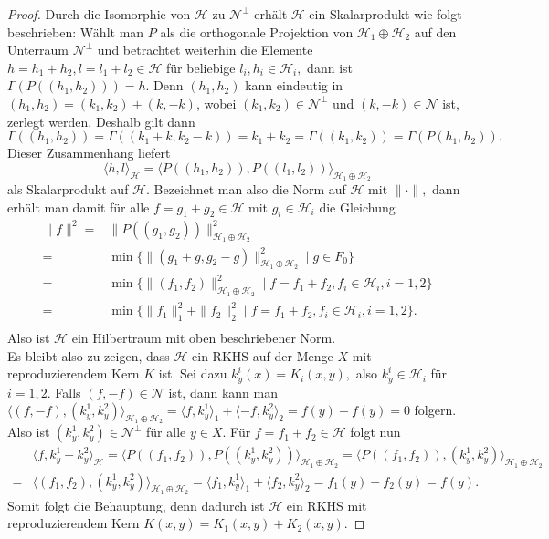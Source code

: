 \documentclass[12pt,titlepage,twoside,cleardoublepage]{article}
\theoremstyle{nummermitklammern}
\numberwithin{equation}{section}
\begin{document}
\begin{proof}
 Durch die Isomorphie von $\mathcal{H}$ zu $\mathcal{N}^{\bot}$ erhält $\mathcal{H}$ ein Skalarprodukt wie folgt beschrieben: Wählt man $P$ als die orthogonale Projektion von $\mathcal{H}_1\oplus \mathcal{H}_2$ auf den Unterraum $\mathcal{N}^{\bot}$ und betrachtet weiterhin die Elemente $h=h_1+h_2,l=l_1+l_2\in \mathcal{H}$ für beliebige $l_i,h_i\in \mathcal{H}_i,$ dann ist $\Gamma(P((h_1,h_2)))=h.$ Denn $(h_1,h_2)$ kann eindeutig in $(h_1,h_2)=(k_1,k_2)+(k,-k)$, wobei $(k_1,k_2)\in \mathcal{N}^{\bot}$ und $(k,-k)\in \mathcal{N}$ ist, zerlegt werden. Deshalb gilt dann $\Gamma((h_1,h_2))=\Gamma((k_1+k,k_2-k))=k_1+k_2=\Gamma((k_1,k_2))=\Gamma(P(h_1,h_2)).$ Dieser Zusammenhang liefert
\[
\langle h,l\rangle_{\mathcal{H}}=\langle P((h_1,h_2)),P((l_1,l_2))\rangle_{\mathcal{H}_1\oplus \mathcal{H}_2} 
\] als Skalarprodukt auf $\mathcal{H}.$ 
 Bezeichnet man also die Norm auf $\mathcal{H}$ mit $\|\cdot\|,$ dann erhält man damit für alle $f=g_1+g_2\in \mathcal{H}$ mit $g_i\in \mathcal{H}_i$ die Gleichung
 \begin{align*}
 \|f\|^2=&\|P((g_1,g_2))\|^2_{\mathcal{H}_1 \oplus \mathcal{H}_2}\\
=&\min\{\|(g_1+g,g_2-g)\|^2_{\mathcal{H}_1 \oplus \mathcal{H}_2}\mid g \in F_{0}\}\\
=&\min\{\|(f_1,f_2)\|^2_{\mathcal{H}_1 \oplus \mathcal{H}_2}\mid f=f_1+f_2,f_i\in \mathcal{H}_i,i=1,2\}\\
=&\min\{\|f_1\|_1^2+\|f_2\|_2^2\mid f=f_1+f_2,f_i\in \mathcal{H}_i,i=1,2\}.\\ 
\end{align*} 
 Also ist $\mathcal{H}$ ein Hilbertraum mit oben beschriebener Norm.\\
Es bleibt also zu zeigen, dass $\mathcal{H}$ ein RKHS auf der Menge $X$ mit reproduzierendem Kern $K$ ist. Sei dazu $k^i_y(x)=K_i(x,y), $ also $k^i_y\in \mathcal{H}_i$ für $i=1,2.$ Falls $(f,-f)\in \mathcal{N}$ ist, dann kann man $\langle (f,-f),(k^1_y,k^2_y) \rangle_{\mathcal{H}_1\oplus\mathcal{H}_2}=\langle f,k^1_y \rangle_1+\langle -f,k^2_y \rangle_2=f(y)-f(y)=0$ folgern. Also ist $(k_y^1,k_y^2)\in \mathcal{N}^{\bot}$ für alle $y\in X.$ Für $f=f_1+f_2\in \mathcal{H} $ folgt nun   
\begin{align*}
&\langle f,k^1_y +k^2_y \rangle_{\mathcal{H}}=\langle P((f_1,f_2)),P((k^1_y,k^2_y)) \rangle_{\mathcal{H}_1\oplus \mathcal{H}_2}=\langle P((f_1,f_2)),(k^1_y,k^2_y) \rangle_{\mathcal{H}_1\oplus \mathcal{H}_2}\\
=&\langle (f_1,f_2),(k^1_y,k^2_y) \rangle_{\mathcal{H}_1\oplus \mathcal{H}_2}=\langle f_1,k^1_y\rangle_1+\langle f_2,k_y^2\rangle_2=f_1(y)+f_2(y)=f(y).
\end{align*}
Somit folgt die Behauptung, denn dadurch ist $\mathcal{H}$ ein RKHS mit reproduzierendem Kern $K(x,y)=K_1(x,y)+K_2(x,y).$
\end{proof}
\end{document}
